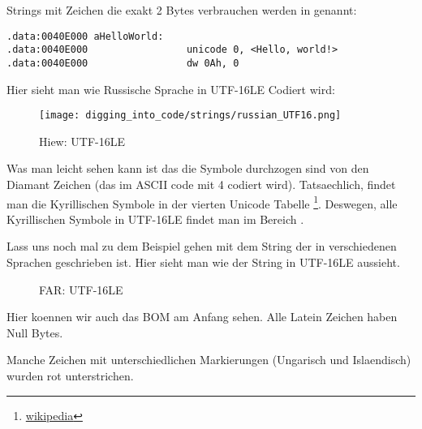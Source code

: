 Strings mit Zeichen die exakt 2 Bytes verbrauchen werden  in \IDA genannt:

\begin{lstlisting}[style=customasmx86]
.data:0040E000 aHelloWorld:
.data:0040E000                 unicode 0, <Hello, world!>
.data:0040E000                 dw 0Ah, 0
\end{lstlisting}

Hier sieht man wie Russische Sprache in UTF-16LE Codiert wird:

\begin{figure}[H]
\centering
\texttt{[image: digging\_into\_code/strings/russian\_UTF16.png]}
\caption{Hiew: UTF-16LE}
\end{figure}

Was man leicht sehen kann ist das die Symbole durchzogen sind von den Diamant Zeichen (das im ASCII code mit 4 codiert wird).
Tatsaechlich, findet man die Kyrillischen Symbole in der vierten Unicode Tabelle 
\footnote{\href{http://go.yurichev.com/17003}{wikipedia}}.
Deswegen, alle Kyrillischen Symbole in UTF-16LE findet man im Bereich .

Lass uns noch mal zu dem Beispiel gehen mit dem String der in verschiedenen Sprachen geschrieben ist.
Hier sieht man wie der String in UTF-16LE aussieht. 

\begin{figure}[H]
\centering
{}
\caption{FAR: UTF-16LE}
\end{figure}

Hier koennen wir auch das \ac{BOM} am Anfang sehen. 
Alle Latein Zeichen haben Null Bytes.

Manche Zeichen mit unterschiedlichen Markierungen (Ungarisch und Islaendisch) wurden rot unterstrichen.



